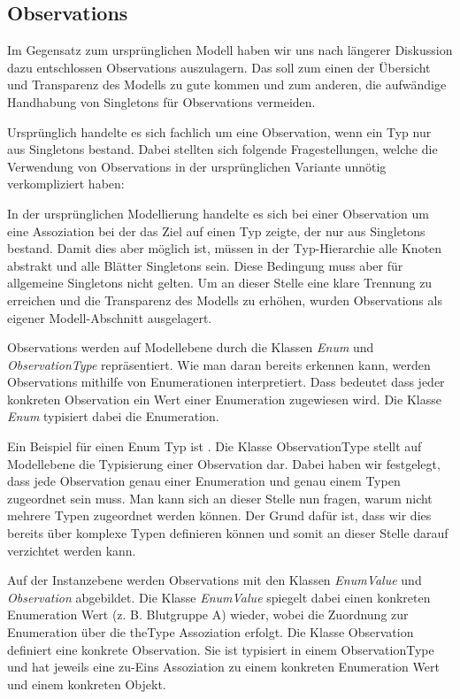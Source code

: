 \subsection{Observations}\label{Observations}
Im Gegensatz zum ursprünglichen Modell haben wir uns nach längerer Diskussion
dazu entschlossen Observations auszulagern. Das soll zum einen der Übersicht
und Transparenz des Modells zu gute kommen und zum anderen, die aufwändige
Handhabung von Singletons für Observations vermeiden.

Ursprünglich handelte es sich fachlich um eine Observation, wenn ein Typ nur aus
Singletons bestand. Dabei stellten sich folgende Fragestellungen, welche die Verwendung
von Observations in der ursprünglichen Variante unnötig verkompliziert
haben:

In der ursprünglichen Modellierung handelte es sich bei einer Observation um eine Assoziation bei der das Ziel auf einen 
Typ zeigte, der nur aus Singletons bestand. Damit dies aber möglich ist, müssen in der Typ-Hierarchie alle Knoten 
abstrakt und alle Blätter Singletons sein. Diese Bedingung muss aber für allgemeine Singletons nicht gelten. Um an dieser 
Stelle eine klare Trennung zu erreichen und die Transparenz des Modells zu erhöhen, wurden Observations als eigener Modell-Abschnitt ausgelagert.


Observations werden auf Modellebene durch die Klassen \emph{Enum} und \emph{ObservationType} repräsentiert. 
Wie man daran bereits erkennen kann, werden Observations mithilfe von Enumerationen interpretiert. 
Dass bedeutet dass jeder konkreten Observation ein Wert einer Enumeration zugewiesen wird. 
Die Klasse \emph{Enum} typisiert dabei die Enumeration. 

Ein Beispiel für einen Enum Typ ist . Die Klasse ObservationType stellt auf Modellebene die 
Typisierung einer Observation dar. Dabei haben wir festgelegt, dass jede Observation genau einer Enumeration 
und genau einem Typen zugeordnet sein muss. Man kann sich an dieser Stelle nun fragen, warum nicht mehrere Typen 
zugeordnet werden können. Der Grund dafür ist, dass wir dies bereits über komplexe Typen definieren können und somit 
an dieser Stelle darauf verzichtet werden kann.

Auf der Instanzebene werden Observations mit den Klassen \emph{EnumValue} und \emph{Observation} abgebildet. 
Die Klasse \emph{EnumValue} spiegelt dabei einen konkreten Enumeration Wert (z. B. Blutgruppe A) wieder, 
wobei die Zuordnung zur Enumeration über die theType Assoziation erfolgt. 
Die Klasse Observation definiert eine konkrete Observation. 
Sie ist typisiert in einem ObservationType und hat jeweils eine zu-Eins Assoziation zu einem konkreten Enumeration Wert 
und einem konkreten Objekt.

